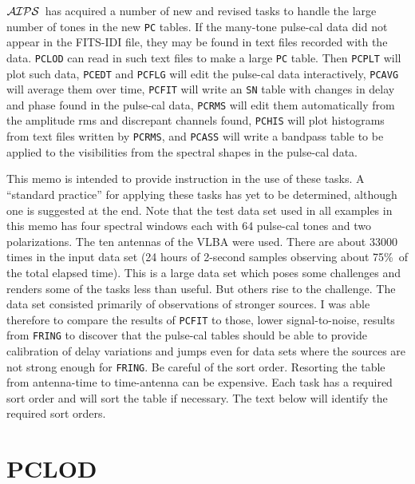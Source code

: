 \documentclass[twoside]{article}
\newcommand{\AIPS}{{$\cal AIPS\/$}}
\begin{document}
\AIPS\ has acquired a number of new and revised tasks to handle the
large number of tones in the new {\tt PC} tables.  If the many-tone
pulse-cal data did not appear in the FITS-IDI file, they may be found
in text files recorded with the data.  {\tt PCLOD} can read in such
text files to make a large {\tt PC} table.  Then {\tt PCPLT} will plot
such data, {\tt PCEDT} and {\tt PCFLG} will edit the pulse-cal data
interactively, {\tt PCAVG} will average them over time, {\tt PCFIT}
will write an {\tt SN} table with changes in delay and phase found in
the pulse-cal data, {\tt PCRMS} will edit them automatically from the
amplitude rms and discrepant channels found, {\tt PCHIS} will plot
histograms from text files written by {\tt PCRMS}, and {\tt PCASS}
will write a bandpass table to be applied to the visibilities from the
spectral shapes in the pulse-cal data.

This memo is intended to provide instruction in the use of these
tasks.  A ``standard practice'' for applying these tasks has yet to be
determined, although one is suggested at the end.  Note that the test
data set used in all examples in this memo has four spectral windows
each with 64 pulse-cal tones and two polarizations.  The ten antennas
of the VLBA were used.  There are about 33000 times in the input data
set (24 hours of 2-second samples observing about 75\%\ of the total
elapsed time).  This is a large data set which poses some challenges
and renders some of the tasks less than useful.  But others rise to
the challenge.  The data set consisted primarily of observations of
stronger sources.   I was able therefore to compare the results of
{\tt PCFIT} to those, lower signal-to-noise, results from {\tt FRING}
to discover that the pulse-cal tables should be able to provide
calibration of delay variations and jumps even for data sets where the
sources are not strong enough for {\tt FRING}\@.  Be careful of the
sort order. Resorting the table from antenna-time to time-antenna can
be expensive.  Each task has a required sort order and will sort the
table if necessary.  The text below will identify the required sort
orders.

\section{PCLOD}
\end{document}
